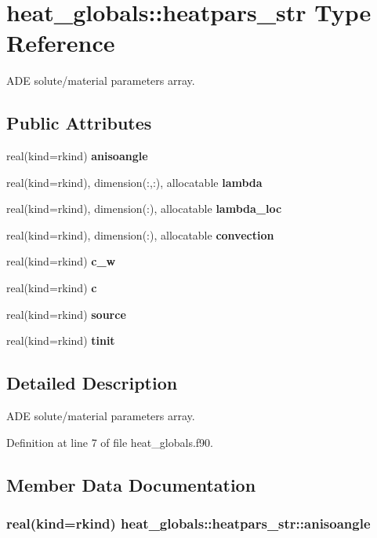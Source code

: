 \section{heat\+\_\+globals\+:\+:heatpars\+\_\+str Type Reference}
\label{structheat__globals_1_1heatpars__str}


A\+DE solute/material parameters array.  


\subsection*{Public Attributes}
\begin{DoxyCompactItemize}
\item 
real(kind=rkind) {\bf anisoangle}
\item 
real(kind=rkind), dimension(\+:,\+:), allocatable {\bf lambda}
\item 
real(kind=rkind), dimension(\+:), allocatable {\bf lambda\+\_\+loc}
\item 
real(kind=rkind), dimension(\+:), allocatable {\bf convection}
\item 
real(kind=rkind) {\bf c\+\_\+w}
\item 
real(kind=rkind) {\bf c}
\item 
real(kind=rkind) {\bf source}
\item 
real(kind=rkind) {\bf tinit}
\end{DoxyCompactItemize}


\subsection{Detailed Description}
A\+DE solute/material parameters array. 

Definition at line 7 of file heat\+\_\+globals.\+f90.



\subsection{Member Data Documentation}
\subsubsection[{anisoangle}]{\setlength{\rightskip}{0pt plus 5cm}real(kind=rkind) heat\+\_\+globals\+::heatpars\+\_\+str\+::anisoangle}\label{structheat__globals_1_1heatpars__str_a735d98c4478fc1f9f89c4d4b50989b53}


